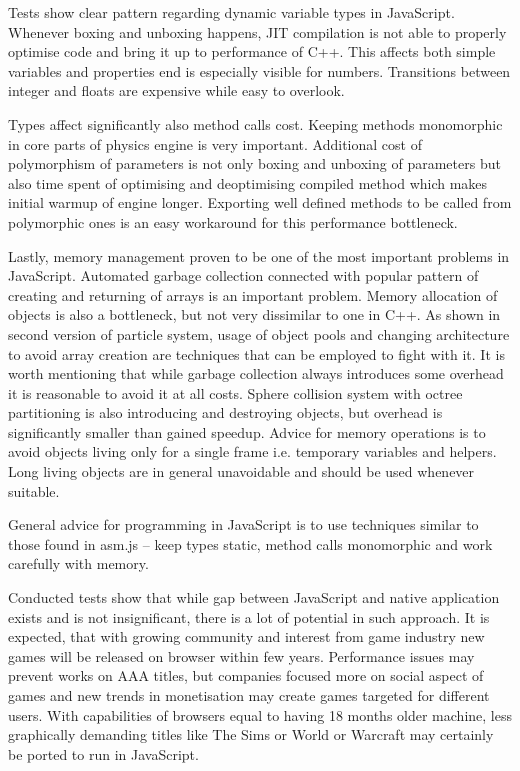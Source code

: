 Tests show clear pattern regarding dynamic variable types in JavaScript. Whenever boxing and unboxing happens, JIT compilation is not able to properly optimise code and bring it up to performance of C++. This affects both simple variables and properties end is especially visible for numbers. Transitions between integer and floats are expensive while easy to overlook.

Types affect significantly also method calls cost. Keeping methods monomorphic in core parts of physics engine is very important. Additional cost of polymorphism of parameters is not only boxing and unboxing of parameters but also time spent of optimising and deoptimising compiled method which makes initial warmup of engine longer. Exporting well defined methods to be called from polymorphic ones is an easy workaround for this performance bottleneck.

Lastly, memory management proven to be one of the most important problems in JavaScript. Automated garbage collection connected with popular pattern of creating and returning of arrays is an important problem. Memory allocation of objects is also a bottleneck, but not very dissimilar to one in C++. As shown in second version of particle system, usage of object pools and changing architecture to avoid array creation are techniques that can be employed to fight with it. It is worth mentioning that while garbage collection always introduces some overhead it is reasonable to avoid it at all costs. Sphere collision system with octree partitioning is also introducing and destroying objects, but overhead is significantly smaller than gained speedup. Advice for memory operations is to avoid objects living only for a single frame i.e. temporary variables and helpers. Long living objects are in general unavoidable and should be used whenever suitable.

General advice for programming in JavaScript is to use techniques similar to those found in asm.js -- keep types static, method calls monomorphic and work carefully with memory.

Conducted tests show that while gap between JavaScript and native application exists and is not insignificant, there is a lot of potential in such approach. It is expected, that with growing community and interest from game industry new games will be released on browser within few years. Performance issues may prevent works on AAA titles, but companies focused more on social aspect of games and new trends in monetisation may create games targeted for different users. With capabilities of browsers equal to having 18 months older machine, less graphically demanding titles like The Sims or World or Warcraft may certainly be ported to run in JavaScript.

